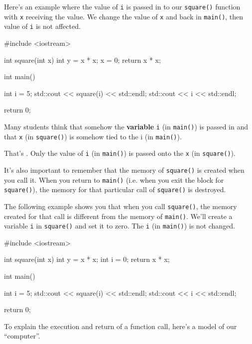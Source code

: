 Here's an example where the value of \texttt{i} is passed in to our \texttt{square()} function with \texttt{x} receiving the value. We change the value of \texttt{x} and back in \texttt{main()}, then value of \texttt{i} is not affected.

\begin{consolethree}[escapeinside=||]
#include <iostream>

int square(int x)
{
    int y = x * x;
    x = 0;
    return x * x;
}

int main()
{
    int i = 5;
    std::cout << square(i) << std::endl;
    std::cout << i << std::endl;

    return 0;
}
\end{consolethree}

Many students think that somehow the \textbf{variable} \texttt{i} (in \texttt{main()}) is passed in and that \texttt{x} (in \texttt{square()}) is somehow tied to the i (in \texttt{main()}).

That's . Only the value of \texttt{i} (in \texttt{main()}) is passed onto the \texttt{x} (in \texttt{square()}). 

It's also important to remember that the memory of \texttt{square()} is created when you call it. When you return to \texttt{main()} (i.e. when you exit the block for \texttt{square()}), the memory for that particular call of \texttt{square()} is destroyed.

The following example shows you that when you call \texttt{square()}, the memory created for that call is different from the memory of \texttt{main()}. We'll create a variable \texttt{i} in \texttt{square()} and set it to zero. The \texttt{i} (in \texttt{main()}) is not changed.

\begin{consolethree}[escapeinside=||]
#include <iostream>

int square(int x)
{
    int y = x * x;
    int i = 0;
    return x * x;
}

int main()
{
    int i = 5;
    std::cout << square(i) << std::endl;
    std::cout << i << std::endl;

    return 0;
}
\end{consolethree}


\newpage{}

To explain the execution and return of a function call, here's a model of our ``computer''.

